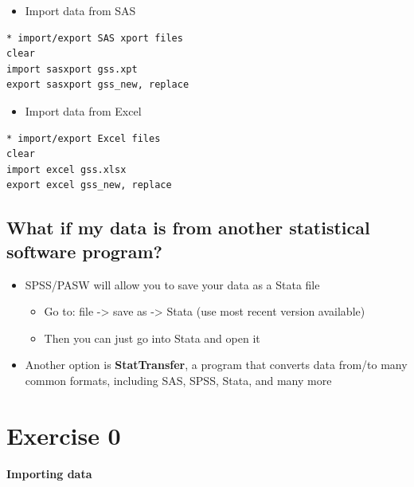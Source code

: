 \documentclass[]{book}
\providecommand{\tightlist}{%
  \setlength{\itemsep}{0pt}\setlength{\parskip}{0pt}}
\begin{document}
\begin{itemize}
\tightlist
\item
  Import data from SAS
\end{itemize}

\begin{verbatim}
* import/export SAS xport files
clear
import sasxport gss.xpt
export sasxport gss_new, replace
\end{verbatim}

\begin{itemize}
\tightlist
\item
  Import data from Excel
\end{itemize}

\begin{verbatim}
* import/export Excel files
clear
import excel gss.xlsx
export excel gss_new, replace
\end{verbatim}

\subsection{What if my data is from another statistical software
program?}\label{what-if-my-data-is-from-another-statistical-software-program}

\begin{itemize}
\tightlist
\item
  SPSS/PASW will allow you to save your data as a Stata file

  \begin{itemize}
  \tightlist
  \item
    Go to: file -\textgreater{} save as -\textgreater{} Stata (use most
    recent version available)
  \item
    Then you can just go into Stata and open it
  \end{itemize}
\item
  Another option is \textbf{StatTransfer}, a program that converts data
  from/to many common formats, including SAS, SPSS, Stata, and many more
\end{itemize}

\section{Exercise 0}\label{exercise-0-4}

\textbf{Importing data}
\end{document}
